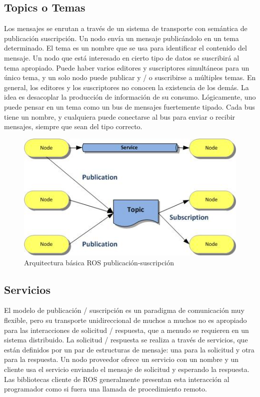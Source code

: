 \subsection{Topics o Temas}
Los mensajes se enrutan a través de un sistema de transporte con semántica de publicación suscripción. Un nodo envía un mensaje publicándolo en un tema determinado. El tema es un nombre que se usa para identificar el contenido del mensaje. Un nodo que está interesado en cierto tipo de datos se suscribirá al tema apropiado. Puede haber varios editores y suscriptores simultáneos para un único tema, y un solo nodo puede publicar y / o suscribirse a múltiples temas. En general, los editores y los suscriptores no conocen la existencia de los demás. La idea es desacoplar la producción de información de su consumo. Lógicamente, uno puede pensar en un tema como un bus de mensajes fuertemente tipado. Cada bus tiene un nombre, y cualquiera puede conectarse al bus para enviar o recibir mensajes, siempre que sean del tipo correcto.

\begin{figure}[H]
    \centering
    \includegraphics[scale=1]{img/ros-architecture-3.jpg}
  	\caption{Arquitectura básica ROS publicación-suscripción}
  	\label{fig:ros-servicio}
\end{figure}

\subsection{Servicios}
El modelo de publicación / suscripción es un paradigma de comunicación muy flexible, pero su transporte unidireccional de muchos a muchos no es apropiado para las interacciones de solicitud / respuesta, que a menudo se requieren en un sistema distribuido. La solicitud / respuesta se realiza a través de servicios, que están definidos por un par de estructuras de mensaje: una para la solicitud y otra para la respuesta. Un nodo proveedor ofrece un servicio con un nombre y un cliente usa el servicio enviando el mensaje de solicitud y esperando la respuesta. Las bibliotecas cliente de ROS generalmente presentan esta interacción al programador como si fuera una llamada de procedimiento remoto.\\

